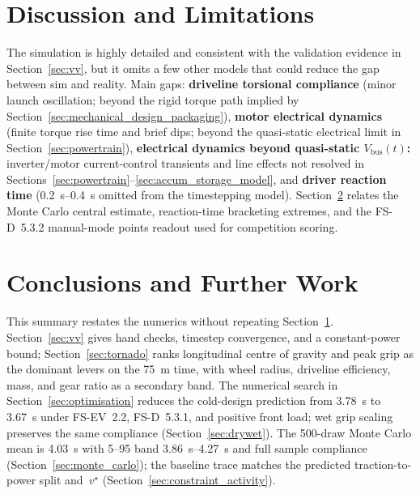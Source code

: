 \section{Discussion and Limitations}
\label{sec:discussion}

The simulation is highly detailed and
consistent with the validation evidence in Section~\ref{sec:vv}, but it
omits a few other models that could reduce the gap between sim and reality. Main gaps:
\textbf{driveline torsional compliance} (minor launch oscillation; beyond the rigid torque path implied by Section~\ref{sec:mechanical_design_packaging}),
\textbf{motor electrical dynamics} (finite torque rise time and brief dips; beyond the quasi-static electrical limit in Section~\ref{sec:powertrain}),
\textbf{electrical dynamics beyond quasi-static $V_{\mathrm{bus}}(t)$:} inverter/motor current-control transients and line effects not resolved in Sections~\ref{sec:powertrain}--\ref{sec:accum_storage_model}, and \textbf{driver reaction time}
(\SIrange{0.2}{0.4}{\second} omitted from the timestepping model).
Section~\ref{sec:conclusions} relates the Monte Carlo central estimate,
reaction-time bracketing extremes, and the FS-D~5.3.2 manual-mode
points readout used for competition scoring.

\section{Conclusions and Further Work}
\label{sec:conclusions}

\noindent This summary restates the numerics without repeating Section~\ref{sec:discussion}.
Section~\ref{sec:vv} gives hand checks, timestep convergence, and a constant-power bound; Section~\ref{sec:tornado} ranks longitudinal centre of gravity and peak grip as the dominant levers on the \SI{75}{\metre} time, with wheel radius, driveline efficiency, mass, and gear ratio as a secondary band.
The numerical search in Section~\ref{sec:optimisation} reduces the cold-design prediction from \SI{3.78}{\second} to \SI{3.67}{\second} under FS-EV~2.2, FS-D~5.3.1, and positive front load; wet grip scaling preserves the same compliance (Section~\ref{sec:drywet}).
The \num{500}-draw Monte Carlo mean is \SI{4.03}{\second} with 5--95 band \SIrange{3.86}{4.27}{\second} and full sample compliance (Section~\ref{sec:monte_carlo}); the baseline trace matches the predicted traction-to-power split and~$v^\star$ (Section~\ref{sec:constraint_activity}).

